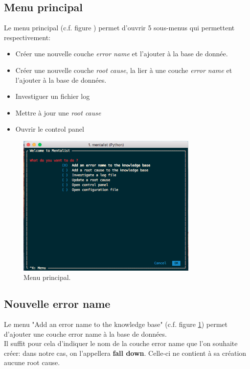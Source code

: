 \subsection{Menu principal}
\label{Industrialisation du produit: Utilisation suggérée des outils: Menu principal}
Le menu principal (c.f. figure ) permet d'ouvrir 5 sous-menus qui permettent respectivement:
\begin{itemize}
	\item Créer une nouvelle couche \emph{error name} et l'ajouter à la base de donnée.
	\item Créer une nouvelle couche \emph{root cause}, la lier à une couche \emph{error name} et l'ajouter à la base de données.
	\item Investiguer un fichier log
	\item Mettre à jour une \emph{root cause}
	\item Ouvrir le control panel
\end{itemize}

\begin{figure}[H]
	\centering\includegraphics[height=7cm]{images/main_menu.png}
	\caption[Menu principal]{Menu principal.}
	\label{fig:Menu principal}
\end{figure} 

\subsection{Nouvelle error name}
\label{Industrialisation du produit: Utilisation suggérée des outils: Nouvelle error name}
Le menu "Add an error name to the knowledge base" (c.f. figure 	\ref{fig:Menu principal}) permet d'ajouter une couche error name à la base de données. \\
Il suffit pour cela d'indiquer le nom de la couche error name que l'on souhaite créer: dans notre cas, on l'appellera \textbf{fall down}. Celle-ci ne contient à sa création aucune root cause.

